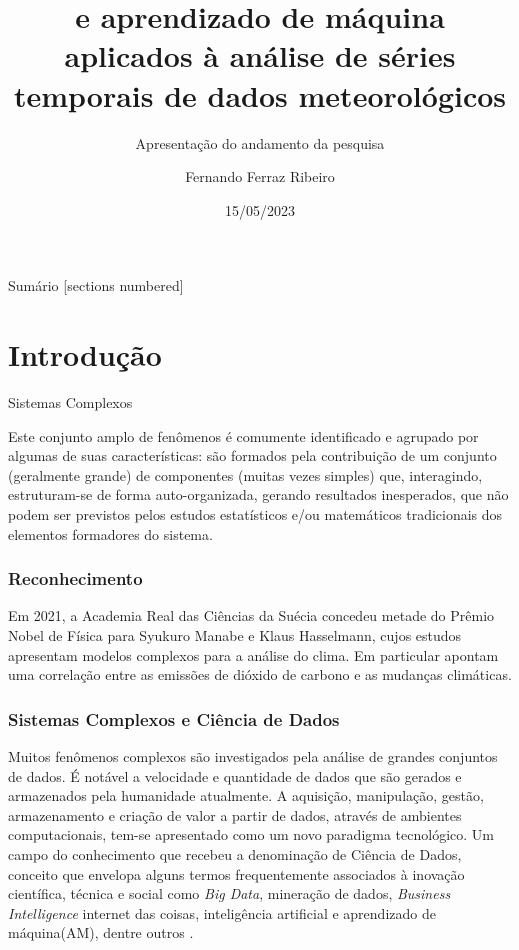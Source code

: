 \documentclass[10pt]{beamer}
\title{\dmc e aprendizado de máquina aplicados à análise de séries temporais de dados meteorológicos}
\subtitle{Apresentação do andamento da pesquisa}
\date{15/05/2023}
\author{Fernando Ferraz Ribeiro}
\institute{UEFS PPGM - Feira de Santana, BA}
\begin{document}
\maketitle

\begin{frame}{Sumário}
  [sections numbered]
  \tableofcontents[hideallsubsections]
\end{frame}

\section{Introdução}

\begin{frame}[fragile]{Sistemas Complexos}

  Este conjunto amplo de fenômenos é comumente identificado e agrupado por algumas de suas características: são formados pela contribuição de um conjunto (geralmente grande) de componentes (muitas vezes simples) que, interagindo, estruturam-se de forma auto-organizada, gerando resultados inesperados, que não podem ser previstos pelos estudos estatísticos e/ou matemáticos tradicionais dos elementos formadores do sistema.

\end{frame}

\begin{frame}
  \frametitle{Reconhecimento}

  Em 2021, a Academia Real das Ciências da Suécia concedeu metade do Prêmio Nobel de Física para Syukuro Manabe e Klaus Hasselmann, cujos estudos apresentam modelos complexos para a análise do clima. Em particular apontam uma correlação entre as emissões de dióxido de carbono e as mudanças climáticas.  

\end{frame}

\begin{frame}
  \frametitle{Sistemas Complexos e Ciência de Dados}

  Muitos fenômenos complexos são investigados pela análise de grandes conjuntos de dados. É notável a velocidade e quantidade de dados que são gerados e armazenados pela humanidade atualmente. A aquisição, manipulação, gestão, armazenamento e criação de valor a partir de dados, através de ambientes computacionais, tem-se apresentado como um novo paradigma tecnológico. Um campo do conhecimento que recebeu a denominação de Ciência de Dados, conceito que envelopa alguns termos frequentemente associados à inovação científica, técnica e social como \emph{Big Data}, mineração de dados, \emph{Business Intelligence} internet das coisas, inteligência artificial e aprendizado de máquina(AM), dentre outros \cite[p. 12-13]{EMCdata2015}.

  

\end{frame}
\end{document}
